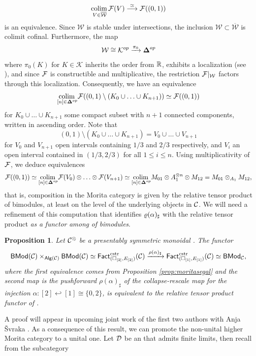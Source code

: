 \documentclass[10pt, reqno, twoside
, final
]{amsart}
\numberwithin{equation}{subsection}%
\theoremstyle{definition}
\theoremstyle{definition}
\theoremstyle{definition}
\theoremstyle{definition}
\theoremstyle{definition}
\theoremstyle{definition}
\theoremstyle{definition}
\theoremstyle{definition}
\theoremstyle{definition}
\theoremstyle{plain}
\theoremstyle{definition}
\theoremstyle{plain}
\theoremstyle{definition}
\theoremstyle{plain}
\theoremstyle{definition}
\theoremstyle{definition}
\theoremstyle{plain}
\theoremstyle{plain}
\theoremstyle{definition}
\theoremstyle{plain}
\theoremstyle{plain}
\newtheorem{prop}[defn]{Proposition}
\theoremstyle{plain}
\begin{document}
\[  \underset{V\in \overline{\mathcal{W}}}{\mathrm{colim}\,} \mathcal{F}(V) \overset{\simeq}{\longrightarrow} \mathcal{F}((0,1))  \]
is an equivalence. Since $\mathcal{W}$ is stable under intersections, the inclusion $\mathcal{W}\subset \overline{\mathcal{W}}$ is colimit cofinal. Furthermore, the map
\[ \mathcal{W} \cong \mathcal{K}^{op} \xrightarrow{\pi_0} \boldsymbol{\Delta}^{op} \]
where $\pi_0(K)$ for $K \in\mathcal{K}$ inherits the order from $\mathbb{R}$, exhibits a localization (see \cite[Proposition A.2.2]{KSW}), and since $\mathcal{F}$ is constructible and multiplicative, the restriction $\mathcal{F}|_{\mathcal{W}}$ factors through this localization. Consequently, we have an equivalence 
\[ \underset{[n]\in \boldsymbol{\Delta}^{op}}{\mathrm{colim}\,} \mathcal{F}((0,1)\setminus (K_0\cup \ldots \cup K_{n+1})) \simeq \mathcal{F}((0,1))  \]
for $K_0\cup \ldots \cup K_{n+1}$ some compact subset with $n+1$ connected components, written in ascending order. Note that 
\[(0,1)\setminus (K_0\cup \ldots \cup K_{n+1}) = V_0\cup \ldots \cup V_{n+1}  \]
for $V_0$ and $V_{n+1}$ open intervals containing $1/3$ and $2/3$ respectively, and $V_i$ an open interval contained in $ (1/3,2/3)$ for all $1\leq i\leq n$. Using multiplicativity of $\mathcal{F}$, we deduce equivalences 
\[ \mathcal{F}((0,1))\simeq \underset{[n]\in \boldsymbol{\Delta}^{op}}{\mathrm{colim}\,} \mathcal{F}(V_0)\otimes \ldots \otimes \mathcal{F}(V_{n+1}) \simeq \underset{[n]\in \boldsymbol{\Delta}^{op}}{\mathrm{colim}\,} M_{01} \otimes A_1^{\otimes n}\otimes M_{12} = M_{01}\otimes_{A_1}M_{12},   \]
that is, composition in the Morita category is given by the relative tensor product of bimodules, at least on the level of the underlying objects in $\mathcal{C}$. We will need a refinement of this computation that identifies $\varrho(\alpha)_{\sharp}$ with the relative tensor product \emph{as a functor among \infcats of bimodules}.
\begin{prop}\label{prop:relativetensorprod}
Let $\mathcal{C}^{\otimes}$ be a presentably symmetric monoidal \infcatt. The functor 
\[  \mathsf{BMod}(\mathcal{C})\times_{\mathsf{Alg}(\mathcal{C})}\mathsf{BMod}(\mathcal{C}) \simeq \mathsf{Fact}_{(\square_{[2]},E_{[2]})}^{\mathrm{cstr}}(\mathcal{C})\xrightarrow{\rho(\alpha)_{\sharp}} \mathsf{Fact}_{(\square_{[1]},E_{[1]})}^{\mathrm{cstr}}(\mathcal{C}) \simeq \mathsf{BMod}_{\mathcal{C}},\]
where the first equivalence comes from Proposition \ref{prop:moritasegal} and the second map is the pushforward $\rho(\alpha)_{\sharp}$ of the collapse-rescale map for the injection $\alpha:[2]\hookleftarrow [1]\cong \{0,2\}$, is equivalent to the relative tensor product functor of \cite[Example 4.4.2.1]{LurHA}.
\end{prop}
A proof will appear in upcoming joint work of the first two authors with Anja \v{S}vraka \cite{ScStSv}. As a consequence of this result, we can promote the non-unital higher Morita category to a unital one. Let $\mathcal{D}$ be an \infcat that admits finite limits, then recall from \cite{Haugseng_quasi} the subcategory  
\end{document}
